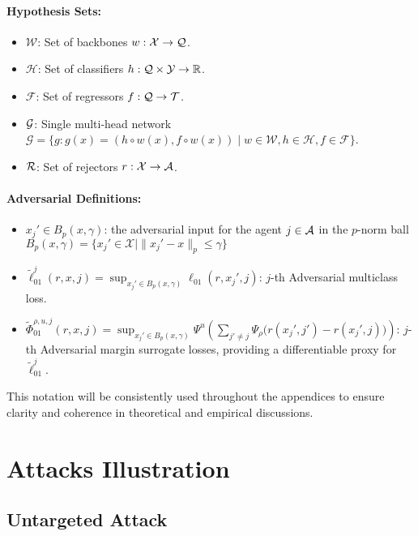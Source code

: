 \begin{appendices}
\paragraph{Hypothesis Sets:}
\begin{itemize}
    \item \(\mathcal{W}\): Set of backbones $w: \mathcal{X}\to\mathcal{Q}$.  
    \item \( \mathcal{H} \): Set of classifiers \( h: \mathcal{Q}\times\mathcal{Y} \to \mathbb{R} \).
    \item \( \mathcal{F} \): Set of regressors \( f: \mathcal{Q} \to \mathcal{T} \).
    \item $\mathcal{G}$: Single multi-head network $\mathcal{G} = \{ g : g(x) = (h \circ w(x), f \circ w(x)) \mid w \in \mathcal{W}, h \in \mathcal{H}, f \in \mathcal{F} \}$.
    \item $\mathcal{R}$: Set of rejectors $r:\mathcal{X}\rightarrow\mathcal{A}$. 
\end{itemize}

\paragraph{Adversarial Definitions:}
\begin{itemize}
    \item $x_j' \in B_p(x,\gamma)$: the adversarial input for the agent $j\in\mathcal{A}$ in the $p$-norm ball \( B_p(x, \gamma) = \{ x_j' \in \mathcal{X} \mid \|x_j' - x\|_p \leq \gamma \} \)
    \item \( \widetilde{\ell}_{01}^j(r,x,j) = \sup_{x_j' \in B_p(x, \gamma)} \ell_{01}(r,x_j', j) \): $j$-th Adversarial multiclass loss.
    \item \( \widetilde{\Phi}_{01}^{\rho,u,j}(r, x, j) = \sup_{x_j' \in B_p(x, \gamma)} \Psi^u \left( \sum_{j' \neq j} \Psi_\rho \big( r(x_j', j') - r(x_j', j) \big) \right)\): $j$-th Adversarial margin surrogate losses, providing a differentiable proxy for \( \widetilde{\ell}_{01}^j \).
\end{itemize}


This notation will be consistently used throughout the appendices to ensure clarity and coherence in theoretical and empirical discussions.
\newpage

\section{Attacks Illustration}\label{attacks}

\subsection{Untargeted Attack}


\end{appendices}

